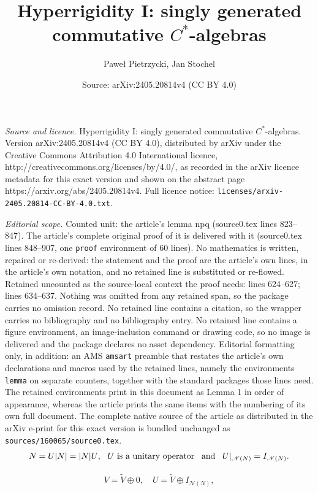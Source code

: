\documentclass[10pt,a4paper]{amsart}
\title{Hyperrigidity I: singly generated commutative $C^*$-algebras}
\author{Pawe{\l} Pietrzycki, Jan Stochel}
\date{Source: arXiv:2405.20814v4 (CC BY 4.0)}
\newcommand*{\nul}{\mathscr{N}}
\begin{document}
\maketitle

\noindent\emph{Source and licence.} Hyperrigidity I: singly generated commutative $C^*$-algebras. Version arXiv:2405.20814v4 (CC BY 4.0), distributed by arXiv under the Creative Commons Attribution 4.0 International licence, http://creativecommons.org/licenses/by/4.0/, as recorded in the arXiv licence metadata for this exact version and shown on the abstract page https://arxiv.org/abs/2405.20814v4. Full licence notice: \texttt{licenses/arxiv-2405.20814-CC-BY-4.0.txt}.\par\smallskip

\noindent\textit{Editorial scope.} Counted unit: the article's lemma npq (source0.tex lines 823--847). The article's complete original proof of it is delivered with it (source0.tex lines 848--907, one \texttt{proof} environment of 60 lines). No mathematics is written, repaired or re-derived: the statement and the proof are the article's own lines, in the article's own notation, and no retained line is substituted or re-flowed.  Retained uncounted as the source-local context the proof needs: lines 624--627; lines 634--637.  Nothing was omitted from any retained span, so the package carries no omission record.  No retained line contains a citation, so the wrapper carries no bibliography and no bibliography entry.  No retained line contains a figure environment, an image-inclusion command or drawing code, so no image is delivered and the package declares no asset dependency.  Editorial formatting only, in addition: an AMS \texttt{amsart} preamble that restates the article's own declarations and macros used by the retained lines, namely the environments \texttt{lemma} on separate counters, together with the standard packages those lines need.  The retained environments print in this document as Lemma 1 in order of appearance, whereas the article prints the same items with the numbering of its own full document.  The complete native source of the article as distributed in the arXiv e-print for this exact version is bundled unchanged as \texttt{sources/160065/source0.tex}.
   \begin{align} \label{pdu}
\text{$N=U |N|=|N|U$, \, $U$ is a unitary operator \,
and \, $U|_{\nul(N)}=I_{\nul(N)}$.}
   \end{align}

   \begin{align} \label{orotrh}
V=\tilde V \oplus 0, \quad U=\tilde V \oplus
I_{\nul(N)},
   \end{align}
\end{document}
